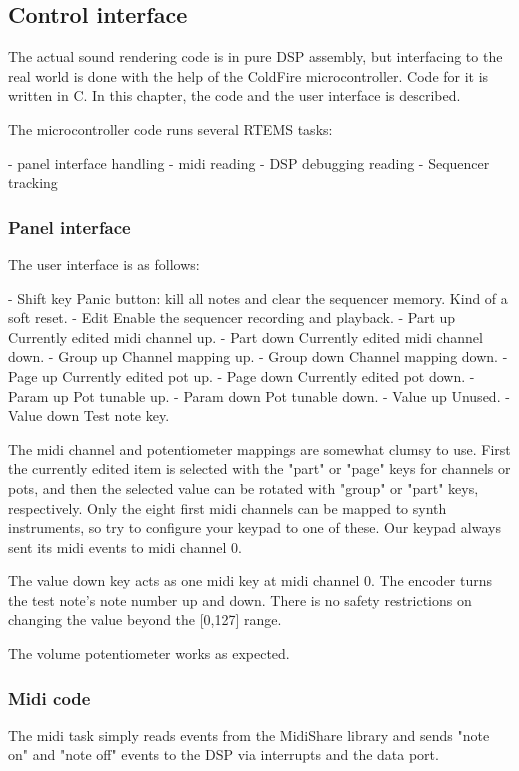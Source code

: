 \documentclass[10pt,a4paper,oneside]{article}
\begin{document}
\subsection{Control interface}

The actual sound rendering code is in pure DSP assembly, but interfacing to the real world is done with the help of the ColdFire microcontroller. Code for it is written in C. In this chapter, the code and the user interface is described.

The microcontroller code runs several RTEMS tasks:

- panel interface handling
- midi reading
- DSP debugging reading
- Sequencer tracking


\subsubsection{Panel interface}

The user interface is as follows:

- Shift key	Panic button: kill all notes and clear the sequencer memory. Kind of a soft reset.
- Edit	Enable the sequencer recording and playback.
- Part up	Currently edited midi channel up.
- Part down	Currently edited midi channel down.
- Group up	Channel mapping up.
- Group down	Channel mapping down.
- Page up	Currently edited pot up.
- Page down	Currently edited pot down.
- Param up	Pot tunable up.
- Param down	Pot tunable down.
- Value up	Unused.
- Value down	Test note key.

The midi channel and potentiometer mappings are somewhat clumsy to use. First the currently edited item is selected with the "part" or "page" keys for channels or pots, and then the selected value can be rotated with "group" or "part" keys, respectively. Only the eight first midi channels can be mapped to synth instruments, so try to configure your keypad to one of these. Our keypad always sent its midi events to midi channel 0.

The value down key acts as one midi key at midi channel 0. The encoder turns the test note's note number up and down. There is no safety restrictions on changing the value beyond the [0,127] range.

The volume potentiometer works as expected.

\subsubsection{Midi code}

The midi task simply reads events from the MidiShare library and sends "note on" and "note off" events to the DSP via interrupts and the data port.
\end{document}
